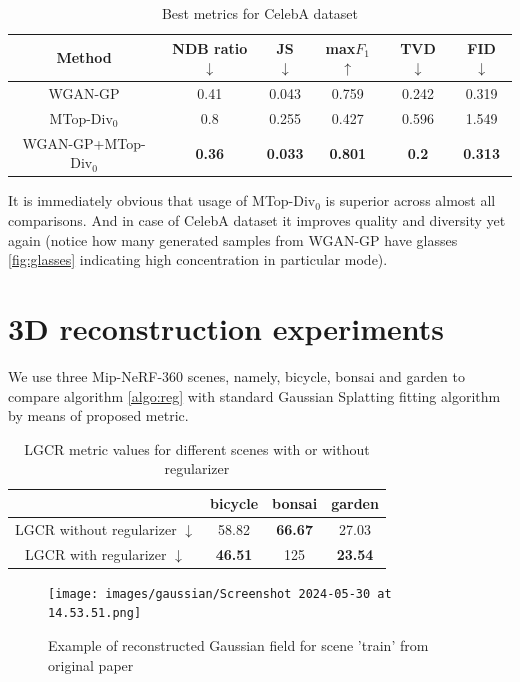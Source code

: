 \begin{table}[h!]
    \centering
    \begin{tabular}{||c||c|c|c|c|c||}
        \hline \hline
         Method  & NDB ratio $\downarrow$& JS $\downarrow$ & max$F_1$ $\uparrow$ & TVD $\downarrow$ & FID $\downarrow$\\ \hline \hline
         WGAN-GP   & 0.41 & 0.043 & 0.759 & 0.242 & 0.319 \\ \hline
         MTop-Div${}_0$   & 0.8 & 0.255 & 0.427 & 0.596 & 1.549 \\ \hline 
         WGAN-GP+MTop-Div${}_0$   & \textbf{0.36} & \textbf{0.033} & \textbf{0.801} & \textbf{0.2} & \textbf{0.313} \\ \hline 
        \hline
    \end{tabular}
    \caption{Best metrics for CelebA dataset}
    \label{tab:my_label}
\end{table}
It is immediately obvious that usage of MTop-Div${}_0$ is superior across almost all comparisons. And in case of CelebA dataset it improves quality and diversity yet again (notice how many generated samples from WGAN-GP have glasses \ref{fig:glasses} indicating high concentration in particular mode).

\section{3D reconstruction experiments}
We use three Mip-NeRF-360 scenes, namely, bicycle, bonsai and garden to compare algorithm \ref{algo:reg} with standard Gaussian Splatting fitting algorithm by means of proposed metric.

\begin{table}[h!]
    \centering
    \begin{tabular}{||c||c|c|c||}
    \hline \hline
        {} & bicycle & bonsai & garden \\
    \hline \hline
        LGCR without regularizer $\downarrow$ & 58.82 & \textbf{66.67} & 27.03 \\
        \hline
        LGCR with regularizer $\downarrow$ & \textbf{46.51} & 125 & \textbf{23.54} \\
    \hline \hline
    \end{tabular}
    \caption{LGCR metric values for different scenes with or without regularizer}
    \label{tab:my_label}
\end{table}

\begin{figure}
    \centering
    \texttt{[image: images/gaussian/Screenshot 2024-05-30 at 14.53.51.png]}
    \caption{Example of reconstructed Gaussian field for scene 'train' from original paper}
    \label{fig:train}
\end{figure}

